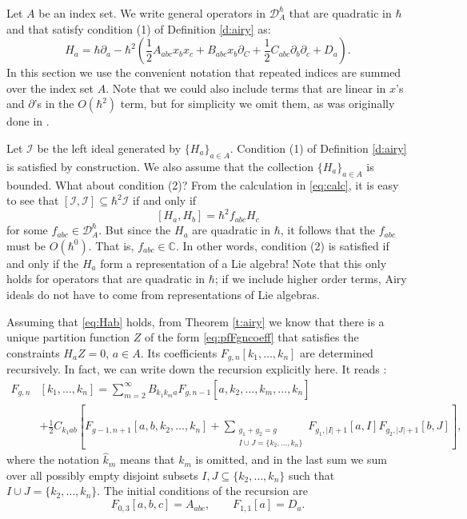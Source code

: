 \documentclass[reqno,oneside,11pt]{amsart}
\theoremstyle{plain}
\theoremstyle{definition}
\theoremstyle{remark}
\numberwithin{equation}{section}
\newcommand{\I}{\mathcal{I}}
\newcommand{\DAh}{\mathcal{D}_A^{\hbar}}
\begin{document}
Let $A$ be an index set. We write general operators in $\DAh$ that are quadratic in $\hbar$ and that satisfy condition (1) of Definition \ref{d:airy} as:
\begin{equation}
H_a = \hbar \partial_a -\hbar^2 \left(  \frac{1}{2} A_{abc} x_b x_c + B_{abc} x_b \partial_C + \frac{1}{2}C_{abc} \partial_b \partial_c + D_a \right).
\end{equation}
In this section we use the convenient notation that repeated indices are summed over the index set $A$.
Note that we could also include terms that are linear in $x$'s and $\partial$'s in the $O(\hbar^2)$ term, but for simplicity we omit them, as was originally done in \cite{KS17}.

Let $\I$ be the left ideal generated by $\{H_a \}_{a \in A}$. Condition (1) of Definition \ref{d:airy} is satisfied by construction. We also assume that the collection $\{H_a\}_{a \in A}$ is bounded. What about condition (2)? From the calculation in \eqref{eq:calc}, it is easy to see that $[\I,\I] \subseteq \hbar^2 \I$ if and only if 
\begin{equation}\label{eq:Hab}
[H_a, H_b] = \hbar^2 f_{abc} H_c
\end{equation}
for some $f_{abc} \in \DAh$. But since the $H_a$ are quadratic in $\hbar$, it follows that the $f_{abc}$ must be  $O(\hbar^0)$. That is, $f_{abc} \in \mathbb{C}$. In other words, condition (2) is satisfied if and only if the $H_a$ form a representation of a Lie algebra! Note that this only holds for operators that are quadratic in $\hbar$; if we include higher order terms, Airy ideals do not have to come from representations of Lie algebras.

Assuming that \eqref{eq:Hab} holds, from Theorem \ref{t:airy} we know that there is a unique partition function $Z$ of the form \eqref{eq:pfFgncoeff} that satisfies the constraints $H_a Z = 0$, $a \in A$. Its coefficients $F_{g,n}[k_1, \ldots, k_n]$ are determined recursively. In fact, we can write down the recursion explicitly here. It reads \cite{ABCO17}:
\begin{align}\label{eq:trA}
F_{g,n}&[k_1, \ldots, k_n]= \sum_{m=2}^\infty B_{k_1 k_m a} F_{g,n-1} [a, k_2, \ldots, \widehat{k}_m, \ldots, k_n] \nonumber\\
& + \frac{1}{2} C_{k_1 a b} \left[F_{g-1,n+1}[a,b, k_2, \ldots,k_n] + \sum_{\substack{g_1+g_2=g \\ I \cup J = \{k_2, \ldots, k_n\}}} F_{g_1, |I|+1}[a,I] F_{g_2, |J|+1} [b, J] \right],
\end{align}
where the notation $\widehat{k}_m$ means that $k_m$ is omitted, and in the last sum we sum over all possibly empty disjoint subsets $I,J \subseteq \{ k_2,\ldots, k_n \}$ such that $I \cup J =  \{ k_2 ,\ldots, k_n \}$. The initial conditions of the recursion are
\begin{equation}\label{eq:trB}
F_{0,3}[a,b,c] = A_{abc}, \qquad F_{1,1}[a] = D_a.
\end{equation}
\end{document}
